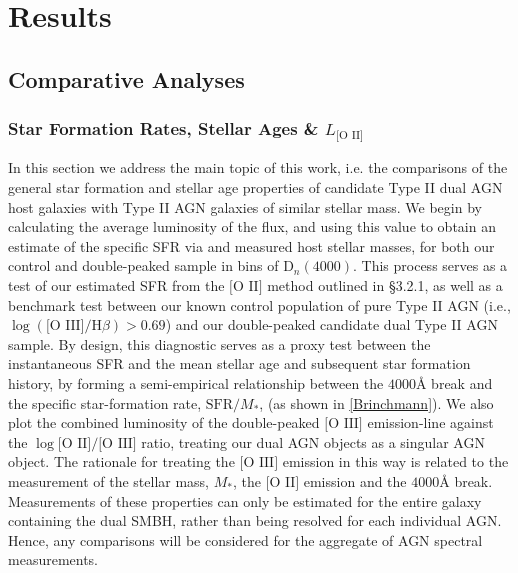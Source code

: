 \section{Results}

\subsection{Comparative Analyses}

\subsubsection{Star Formation Rates, Stellar Ages \& $L_{\text{[O II]}}$}

In this section we address the main topic of this work, i.e. the comparisons of the general star formation and stellar age properties of candidate Type II dual AGN host galaxies with Type II AGN galaxies of similar stellar mass. We begin by calculating the average luminosity of the \text{[O II]} flux, and using this value to obtain an estimate of the specific SFR via \label{eq:Kewley} and measured host stellar masses, for both our control and double-peaked sample in bins of $\text{D}_n(4000)$. This process serves as a test of our estimated SFR from the $\text{[O II]}$ method outlined in §3.2.1, as well as a benchmark test between our known control population of pure Type II AGN (i.e., $\log{(\text{[O III]}/\text{H}\beta)}>{0.69}$) and our double-peaked candidate dual Type II AGN sample. By design, this diagnostic serves as a proxy test between the instantaneous SFR and the mean stellar age and subsequent star formation history, by forming a semi-empirical relationship between the $4000$Å break and the specific star-formation rate, $\text{SFR}/M_{*}$, (as shown in \ref{Brinchmann}). We also plot the combined luminosity of the double-peaked $\text{[O III]}$ emission-line against the $\log{\text{[O II]}/\text{[O III]}}$ ratio, treating our dual AGN objects as a singular AGN object. The rationale for treating the $\text{[O III]}$ emission in this way is related to the measurement of the stellar mass, $M_{*}$, the $\text{[O II]}$ emission and the $4000$Å break. Measurements of these properties can only be estimated for the entire galaxy containing the dual SMBH, rather than being resolved for each individual AGN. Hence, any comparisons will be considered for the aggregate of AGN spectral measurements.

